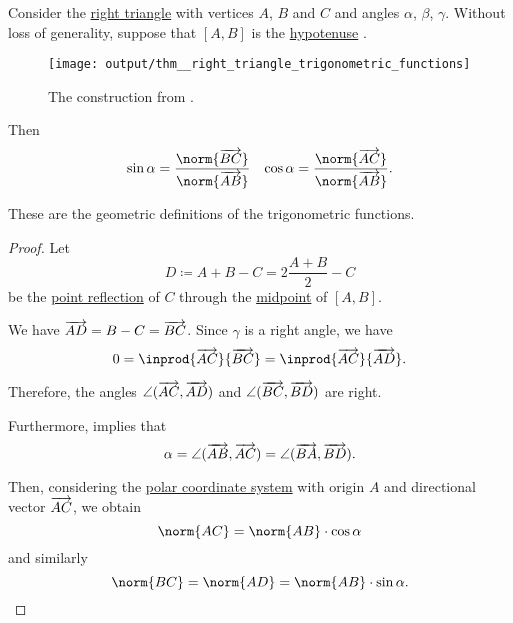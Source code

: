 \begin{proposition}\label{thm:right_triangle_trigonometric_functions}
  Consider the \hyperref[def:triangle/right]{right triangle} with vertices \( A \), \( B \) and \( C \) and angles \( \alpha \), \( \beta \), \( \gamma \). Without loss of generality, suppose that \( [A, B] \) is the \hyperref[thm:right_triangle]{hypotenuse} .

  \begin{figure}[!ht]
    \centering
    \texttt{[image: output/thm\_\_right\_triangle\_trigonometric\_functions]}
    \caption{The construction from .}\label{fig:thm:right_triangle_trigonometric_functions}
  \end{figure}

  Then
  \begin{align*}
    \sin \alpha = \frac {\norm{\vect{BC}}} {\norm{\vect{AB}}}
    &&
    \cos \alpha = \frac {\norm{\vect{AC}}} {\norm{\vect{AB}}}.
  \end{align*}

  These are the geometric definitions of the trigonometric functions.
\end{proposition}
\begin{proof}
  Let
  \begin{equation*}
    D \coloneqq A + B - C = 2 \frac {A + B} 2 - C
  \end{equation*}
  be the \hyperref[def:rigid_motion/point_reflection]{point reflection} of \( C \) through the \hyperref[thm:segment_midpoint]{midpoint} of \( [A, B] \).

  We have \( \overrightarrow{AD} = B - C = \overrightarrow{BC} \). Since \( \gamma \) is a right angle, we have
  \begin{equation*}
    0
    =
    \inprod{\vect{AC}} {\vect{BC}}
    =
    \inprod{\vect{AC}} {\vect{AD}}.
  \end{equation*}

  Therefore, the angles \( \angle(\overrightarrow{AC},\overrightarrow{AD}) \) and \( \angle(\overrightarrow{BC},\overrightarrow{BD}) \) are right.

  Furthermore,  implies that
  \begin{equation*}
    \alpha = \angle(\overrightarrow{AB},\overrightarrow{AC}) = \angle(\overrightarrow{BA},\overrightarrow{BD}).
  \end{equation*}

  Then, considering the \hyperref[con:polar_coordinate_system]{polar coordinate system} with origin \( A \) and directional vector \( \overrightarrow{AC} \), we obtain
  \begin{equation*}
    \norm{AC} = \norm{AB} \cdot \cos \alpha
  \end{equation*}
  and similarly
  \begin{equation*}
    \norm{BC} = \norm{AD} = \norm{AB} \cdot \sin \alpha.
  \end{equation*}
\end{proof}

